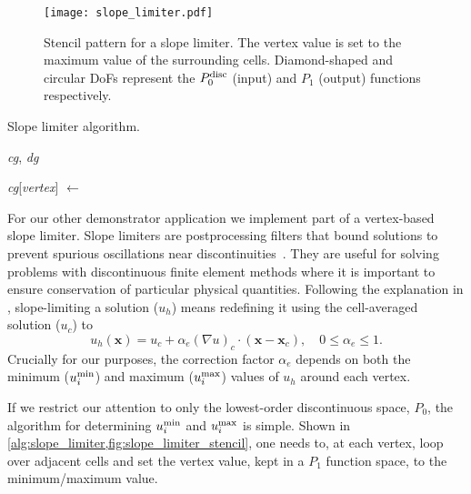 \documentclass[thesis]{subfiles}
\begin{document}
\begin{figure}
  \centering
  \texttt{[image: slope\_limiter.pdf]}
  \caption{
    Stencil pattern for a slope limiter.
    The vertex value is set to the maximum value of the surrounding cells.
    Diamond-shaped and circular DoFs represent the $P_0^\textnormal{disc}$ (input) and $P_1$ (output) functions respectively.
  }
  \label{fig:slope_limiter_stencil}
\end{figure}

\begin{algorithm}
  \caption{
    Slope limiter algorithm.
  }
  \begin{algorithmic}[1]
    \Require \textit{cg}, \textit{dg} 

       
        \State \textit{cg}[\textit{vertex}] $\gets$ 
      \EndFor
    \EndFor
  \end{algorithmic}
  \label{alg:slope_limiter}
\end{algorithm}

For our other demonstrator application we implement part of a vertex-based slope limiter.
Slope limiters are postprocessing filters that bound solutions to prevent spurious oscillations near discontinuities~\cite{biswasParallelAdaptiveFinite1994}.
They are useful for solving problems with discontinuous finite element methods where it is important to ensure conservation of particular physical quantities.
Following the explanation in \cite{kuzminVertexbasedHierarchicalSlope2010}, slope-limiting a solution ($u_h$) means redefining it using the cell-averaged solution ($u_c$) to
\begin{equation}
  u_h(\mathbf{x}) = u_c + \alpha_e(\nabla u)_c \cdot (\mathbf{x} - \mathbf{x}_c), \quad 0 \leq \alpha_e \leq 1 .
\end{equation}
Crucially for our purposes, the correction factor $\alpha_e$ depends on both the minimum ($u_i^{\textnormal{min}}$) and maximum ($u_i^{\textnormal{max}}$) values of $u_h$ around each vertex.

If we restrict our attention to only the lowest-order discontinuous space, $P_0$, the algorithm for determining $u_i^{\textnormal{min}}$ and $u_i^{\textnormal{max}}$ is simple.
Shown in \cref{alg:slope_limiter,fig:slope_limiter_stencil}, one needs to, at each vertex, loop over adjacent cells and set the vertex value, kept in a $P_1$ function space, to the minimum/maximum value.
\end{document}
